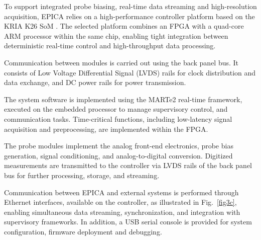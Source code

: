To support integrated probe biasing, real-time data streaming and high-resolution acquisition, EPICA relies on a high-performance controller platform based on the KRIA K26 SoM \cite{KRIA}. The selected platform combines an FPGA with a quad-core ARM processor within the same chip, enabling tight integration between deterministic real-time control and high-throughput data processing.

Communication between modules is carried out using the back panel bus. It consists of Low Voltage Differential Signal (LVDS) rails for clock distribution and data exchange, and DC power rails for power transmission.

The system software is implemented using the MARTe2 \cite{manduchi} real-time framework, executed on the embedded processor to manage supervisory control, and communication tasks. Time-critical functions, including low-latency signal acquisition and preprocessing, are implemented within the FPGA. 

The probe modules implement the analog front-end electronics, probe bias generation, signal conditioning, and analog-to-digital conversion. Digitized measurements are transmitted to the controller via LVDS rails of the back panel bus for further processing, storage, and streaming.

Communication between EPICA and external systems is performed through Ethernet interfaces, available on the controller, as illustrated in Fig.~\ref{fig3c}, enabling simultaneous data streaming, synchronization, and integration with supervisory frameworks. In addition, a USB serial console is provided for system configuration, firmware deployment and debugging.